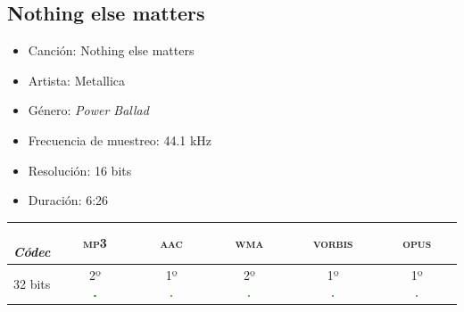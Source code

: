 \documentclass[11pt,a4paper]{article}
\begin{document}
\subsection{Nothing else matters}

\begin{itemize}
	\item Canción: Nothing else matters
	\item Artista: Metallica
	\item Género: \textit{Power Ballad}
	\item Frecuencia de muestreo: 44.1 kHz
	\item Resolución: 16 bits
	\item Duración: 6:26
\end{itemize}

\begin{table}[H]
\centering
\begin{tabular}{|c|c|c|c|c|c|}
\hline
\diagbox[width=15em]{Resolución}{\\\textit{Códec}} & \textsc{ mp3 } & \textsc{ aac } & \textsc{ wma } & \textsc{vorbis} & \textsc{ opus } \\ \hline

32 bits & \makecell{2º\\ \includegraphics[width=0.03\textwidth]{mb.png}} & \makecell{1º\\ \includegraphics[width=0.03\textwidth]{mb.png}} & \makecell{2º\\ \includegraphics[width=0.03\textwidth]{mb.png}} & \makecell{1º\\ \includegraphics[width=0.03\textwidth]{mb.png}} & \makecell{1º\\ \includegraphics[width=0.03\textwidth]{mb.png}} \\ \hline
 

\end{tabular}
\end{table}
\end{document}

